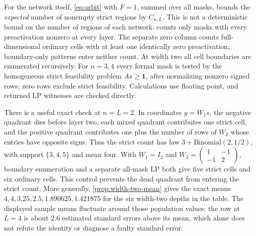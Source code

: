 For the network itself, \cref{eq:orbit} with $F=1$, summed over all masks, bounds the \emph{expected} number of nonempty strict regions by $C_{n,L}$. This is not a deterministic bound on the number of regions of each network.  counts only masks with every preactivation nonzero at every layer. The separate zero column counts full-dimensional ordinary cells with at least one identically zero preactivation; boundary-only patterns enter neither count. At width two all cell boundaries are enumerated recursively. For $n=3,4$ every formal mask is tested by the homogeneous strict feasibility problem $A s\ge\mathbf1$, after normalizing nonzero signed rows; zero rows exclude strict feasibility. Calculations use floating point, and returned LP witnesses are checked directly.

There is a useful exact check at $n=L=2$. In coordinates $y=W_1s$, the negative quadrant dies before layer two, each mixed quadrant contributes one strict cell, and the positive quadrant contributes one plus the number of rows of $W_2$ whose entries have opposite signs. Thus the strict count has law $3+\mathrm{Binomial}(2,1/2)$, with support $\{3,4,5\}$ and mean four. With $W_1=I_2$ and $W_2=\left(\begin{smallmatrix}1&-1\\-1&2\end{smallmatrix}\right)$, boundary enumeration and a separate all-mask LP both give five strict cells and six ordinary cells. This control prevents the dead quadrant from entering the strict count. More generally, \cref{prop:width-two-mean} gives the exact means $4,4,3.25,2.5,1.890625,1.421875$ for the six width-two depths in the table. The displayed sample means fluctuate around those population values; the row at $L=4$ is about $2.6$ estimated standard errors above its mean, which alone does not refute the identity or diagnose a faulty standard error.

